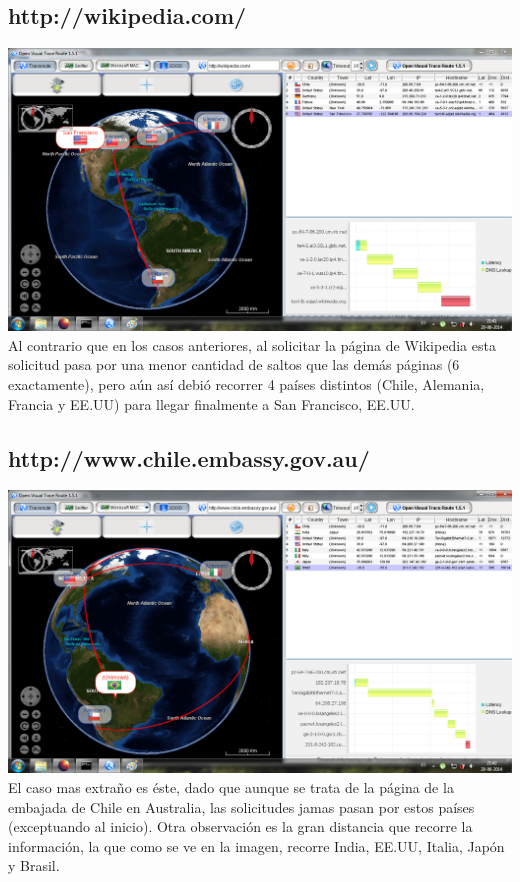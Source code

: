 \documentclass{article}
\begin{document}
\subsection{http://wikipedia.com/}
\includegraphics[scale=0.52]{Img/wikipedia.png} 
Al contrario que en los casos anteriores, al solicitar la página de Wikipedia esta solicitud pasa por una menor cantidad de saltos que las demás páginas (6 exactamente), pero aún así debió recorrer 4 países distintos (Chile, Alemania, Francia y EE.UU) para llegar finalmente a San Francisco, EE.UU.


\subsection{http://www.chile.embassy.gov.au/}
\includegraphics[scale=0.52]{Img/embajada.png} 
El caso mas extraño es éste, dado que aunque se trata de la página de la embajada de Chile en Australia, las solicitudes jamas pasan por estos países (exceptuando al inicio). Otra observación es la gran distancia que recorre la información, la que como se ve en la imagen, recorre India, EE.UU, Italia, Japón y Brasil.
\end{document}
